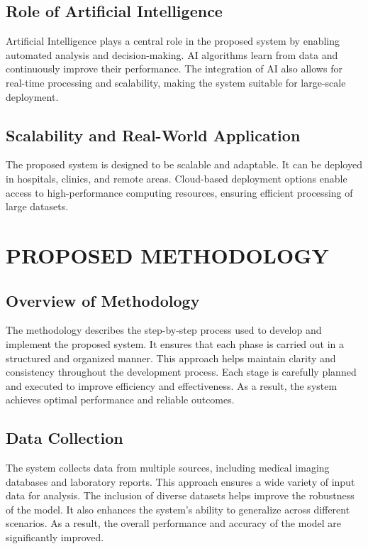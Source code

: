 \documentclass[a4paper,12pt]{report}
\begin{document}
\begin{doublespace}
\subsection{Role of Artificial Intelligence}
\label{sec:role_of_ai}

Artificial Intelligence plays a central role in the proposed system by enabling automated analysis and decision-making. AI algorithms learn from data and continuously improve their performance.
The integration of AI also allows for real-time processing and scalability, making the system suitable for large-scale deployment.

\subsection{Scalability and Real-World Application}
\label{sec:scalability_realworld}
The proposed system is designed to be scalable and adaptable. It can be deployed in hospitals, clinics, and remote areas.
Cloud-based deployment options enable access to high-performance computing resources, ensuring efficient processing of large datasets.

\section{PROPOSED METHODOLOGY}
\subsection{Overview of Methodology}
The methodology describes the step-by-step process used to develop and implement the proposed system. It ensures that each phase is carried out in a structured and organized manner. This approach helps maintain clarity and consistency throughout the development process. Each stage is carefully planned and executed to improve efficiency and effectiveness. As a result, the system achieves optimal performance and reliable outcomes.


\subsection{Data Collection}
The system collects data from multiple sources, including medical imaging databases and laboratory reports. This approach ensures a wide variety of input data for analysis. The inclusion of diverse datasets helps improve the robustness of the model. It also enhances the system’s ability to generalize across different scenarios. As a result, the overall performance and accuracy of the model are significantly improved.



\end{doublespace}
\end{document}
